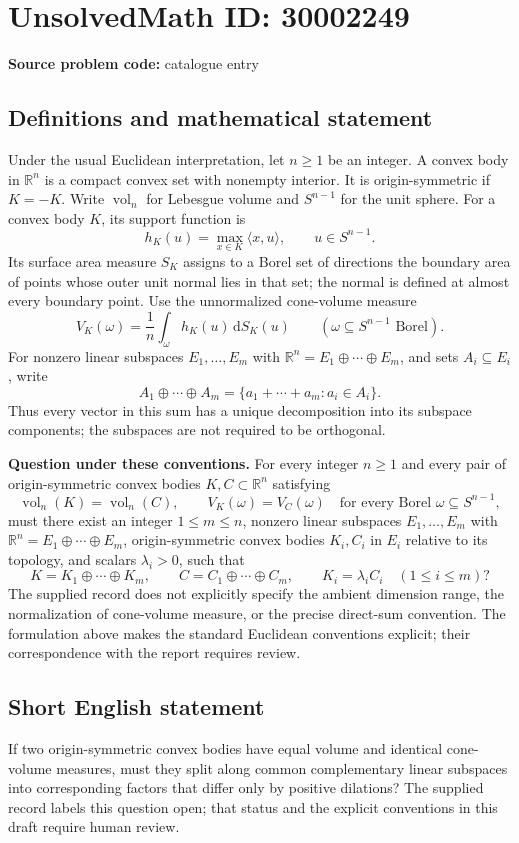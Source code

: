 \documentclass[11pt]{article}
\newcommand{\R}{\mathbb{R}}
\begin{document}
\section*{UnsolvedMath ID: 30002249}
\textbf{Source problem code:} catalogue entry
\subsection{Definitions and mathematical statement}
Under the usual Euclidean interpretation, let \(n\geq 1\) be an integer. A convex body in \(\R^n\) is a compact convex set with nonempty interior. It is origin-symmetric if \(K=-K\). Write \(\operatorname{vol}_n\) for Lebesgue volume and \(S^{n-1}\) for the unit sphere. For a convex body \(K\), its support function is
\[
h_K(u)=\max_{x\in K}\langle x,u\rangle,\qquad u\in S^{n-1}.
\]
Its surface area measure \(S_K\) assigns to a Borel set of directions the boundary area of points whose outer unit normal lies in that set; the normal is defined at almost every boundary point. Use the unnormalized cone-volume measure
\[
V_K(\omega)=\frac1n\int_{\omega}h_K(u)\,\mathrm dS_K(u)
\qquad(\omega\subseteq S^{n-1}\text{ Borel}).
\]
For nonzero linear subspaces \(E_1,\ldots,E_m\) with \(\R^n=E_1\oplus\cdots\oplus E_m\), and sets \(A_i\subseteq E_i\), write
\[
A_1\oplus\cdots\oplus A_m
=\{a_1+\cdots+a_m:a_i\in A_i\}.
\]
Thus every vector in this sum has a unique decomposition into its subspace components; the subspaces are not required to be orthogonal.

\textbf{Question under these conventions.} For every integer \(n\geq1\) and every pair of origin-symmetric convex bodies \(K,C\subset\R^n\) satisfying
\[
\operatorname{vol}_n(K)=\operatorname{vol}_n(C),\qquad
V_K(\omega)=V_C(\omega)\quad\text{for every Borel }\omega\subseteq S^{n-1},
\]
must there exist an integer \(1\leq m\leq n\), nonzero linear subspaces \(E_1,\ldots,E_m\) with \(\R^n=E_1\oplus\cdots\oplus E_m\), origin-symmetric convex bodies \(K_i,C_i\) in \(E_i\) relative to its topology, and scalars \(\lambda_i>0\), such that
\[
K=K_1\oplus\cdots\oplus K_m,\qquad
C=C_1\oplus\cdots\oplus C_m,\qquad
K_i=\lambda_i C_i\quad(1\leq i\leq m)?
\]
The supplied record does not explicitly specify the ambient dimension range, the normalization of cone-volume measure, or the precise direct-sum convention. The formulation above makes the standard Euclidean conventions explicit; their correspondence with the report requires review.
\subsection{Short English statement}
If two origin-symmetric convex bodies have equal volume and identical cone-volume measures, must they split along common complementary linear subspaces into corresponding factors that differ only by positive dilations? The supplied record labels this question open; that status and the explicit conventions in this draft require human review.
\end{document}
